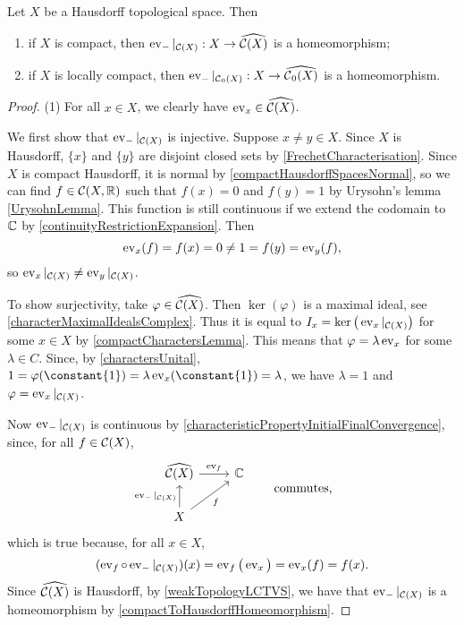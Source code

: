 \begin{proposition}  \label{charactersFunctionAlgebraCompactSpace}
Let $X$ be a Hausdorff topological space. Then
\begin{enumerate}
\item if $X$ is compact, then $\operatorname{ev}_{-}|_{\operatorname{\mathcal{C}}(X)}: X \to \widehat{\operatorname{\mathcal{C}}(X)}$ is a homeomorphism;
\item if $X$ is locally compact, then $\operatorname{ev}_{-}|_{\operatorname{\mathcal{C}}_0(X)}: X \to \widehat{\operatorname{\mathcal{C}}_0(X)}$ is a homeomorphism.
\end{enumerate}
\end{proposition}
\begin{proof}
(1) For all $x\in X$, we clearly have $\operatorname{ev}_x\in \widehat{\operatorname{\mathcal{C}}(X)}$. 

We first show that $\operatorname{ev}_{-}|_{\operatorname{\mathcal{C}}(X)}$ is injective. Suppose $x\neq y \in X$. Since $X$ is Hausdorff, $\{x\}$ and $\{y\}$ are disjoint closed sets by \ref{FrechetCharacterisation}. Since $X$ is compact Hausdorff, it is normal by \ref{compactHausdorffSpacesNormal}, so we can find $f\in \operatorname{\mathcal{C}}(X, \mathbb{R})$ such that $f(x) = 0$ and $f(y) = 1$ by Urysohn's lemma \ref{UrysohnLemma}. This function is still continuous if we extend the codomain to $\mathbb{C}$ by \ref{continuityRestrictionExpansion}.  Then
\[ \operatorname{ev}_x(f) = f(x) = 0 \neq 1 = f(y) = \operatorname{ev}_y(f), \]
so $\operatorname{ev}_x|_{\operatorname{\mathcal{C}}(X)} \neq \operatorname{ev}_y|_{\operatorname{\mathcal{C}}(X)}$.

To show surjectivity, take $\varphi\in\widehat{\operatorname{\mathcal{C}}(X)}$. Then $\ker(\varphi)$ is a maximal ideal, see \ref{characterMaximalIdealsComplex}. Thus it is equal to $I_x = \ker\big(\operatorname{ev}_x|_{\operatorname{\mathcal{C}}(X)}\big)$ for some $x\in X$ by \ref{compactCharactersLemma}. This means that $\varphi = \lambda \operatorname{ev}_x$ for some $\lambda\in C$. Since, by \ref{charactersUnital}, $1 = \varphi(\constant{1}) = \lambda\evalMap_x(\constant{1}) = \lambda$, we have $\lambda = 1$ and $\varphi = \operatorname{ev}_x|_{\operatorname{\mathcal{C}}(X)}$.

Now $\operatorname{ev}_{-}|_{\operatorname{\mathcal{C}}(X)}$ is continuous by \ref{characteristicPropertyInitialFinalConvergence}, since, for all $f\in \operatorname{\mathcal{C}}(X)$,
\[ \begin{tikzcd}
\widehat{\cont(X)} \ar[r, "\evalMap_f"] & \C \\ X \ar[u, "{\evalMap_{-}|_{\cont(X)}}"] \ar[ur, swap, "f"]
\end{tikzcd} \qquad\text{commutes,} \]
which is true because, for all $x\in X$,
\[ (\operatorname{ev}_f\circ \operatorname{ev}_{-}|_{\operatorname{\mathcal{C}}(X)})(x) = \operatorname{ev}_f\big(\operatorname{ev}_x\big) = \operatorname{ev}_x(f) = f(x). \]
Since $\widehat{\operatorname{\mathcal{C}}(X)}$ is Hausdorff, by \ref{weakTopologyLCTVS}, we have that $\operatorname{ev}_{-}|_{\operatorname{\mathcal{C}}(X)}$ is a homeomorphism by \ref{compactToHausdorffHomeomorphism}.


\end{proof}
